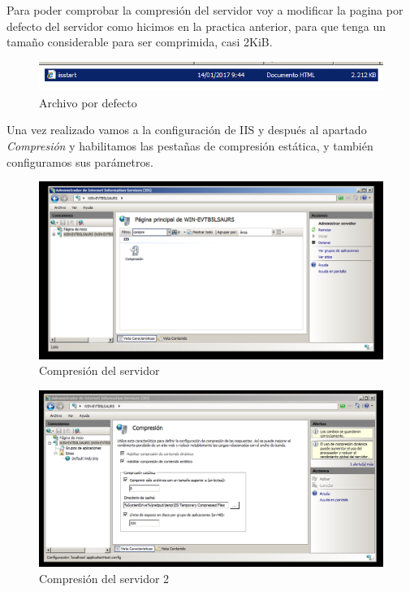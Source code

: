Para poder comprobar la compresión del servidor voy a modificar la pagina por defecto del servidor como hicimos en la practica anterior, para que tenga un tamaño considerable para ser comprimida, casi 2KiB.

\begin{figure}[H] %
	\centering
	\includegraphics[scale=0.5]{pics/2}  %
	\caption{Archivo por defecto} \label{fig:1}
\end{figure}

Una vez realizado vamos a la configuración de IIS y después al apartado \textit{Compresión} y habilitamos las pestañas de compresión estática, y también configuramos sus parámetros.

\begin{figure}[H] %
	\centering
	\includegraphics[scale=0.5]{pics/1}  %
	\caption{Compresión del servidor} \label{fig:2}
\end{figure}

\begin{figure}[H] %
	\centering
	\includegraphics[scale=0.5]{pics/3}  %
	\caption{Compresión del servidor 2} \label{fig:3}
\end{figure}

